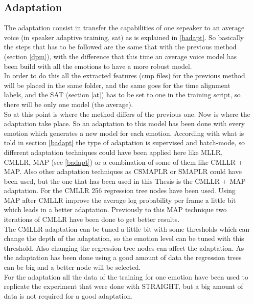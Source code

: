 \subsection{Adaptation}\label{adapt}
The adaptation consist in transfer the capabilities of one sepeaker to an average voice (in speaker adaptive training, sat) as is explained in \ref{badapt}.
So basically the steps that has to be followed are the same that with the previous method (section \ref{dpm}), with the difference that this time an average voice model has been build with all the emotions to have a more robust model.\\
In order to do this all the extracted features (cmp files) for the previous method will be placed in the same folder, and the same goes for the time alignment labels, and the SAT (section \ref{at}) has to be set to one in the training script, so there will be only one model (the average).\\
So at this point is where the method differs of the previous one. Now is where the adaptation take place. So an adaptation to this model has been done with every emotion which generates a new model for each emotion.
According with what is told in section \ref{badapt} the type of adaptation is supervised and batch-mode, so different adaptation techniques could have been applied here like MLLR, CMLLR, MAP (see \ref{badapt}) or a combination of some of them like CMLLR + MAP. Also other adaptation techniques as CSMAPLR or SMAPLR \cite{analysis-hts-adaptation-junichi} could have been used, but the one that has been used in this Thesis is the CMLLR + MAP adaptation. For the CMLLR 256 regression tree nodes have been used.
Using MAP after CMLLR improve the average log probability per frame a little bit which leads in a better adaptation. Previously to this MAP technique two iterations of CMLLR have been done to get better results.\\
The CMLLR adaptation can be tuned a little bit with some thresholds which can change the depth of the adaptation, so the emotion level can be tuned with this threshold. Also changing the regression tree nodes can affect the adaptation. As the adaptation has been done using a good amount of data the regression trees can be big and a better node will be selected.\\
For the adaptation all the data of the training for one emotion have been used to replicate the experiment that were done with STRAIGHT, but a big amount of data is not required for a good adaptation.
